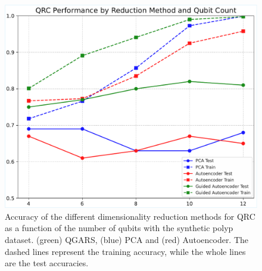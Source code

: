 \documentclass[conference]{IEEEtran}
\begin{document}
\begin{figure}[!t]
    \centering
    \includegraphics[width=\linewidth]{images/results/generated_polyp_dataset/n_qubit_qrc_performance_by_reduction_method.pdf} 
    \caption{Accuracy of the different dimensionality reduction methods for QRC as a function of the number of qubits with the synthetic polyp dataset. (green) QGARS, (blue) PCA and (red) Autoencoder. The dashed lines represent the training accuracy, while the whole lines are the test accuracies.}
    \label{fig:n_qubits_accuracy}
\end{figure}
\end{document}
